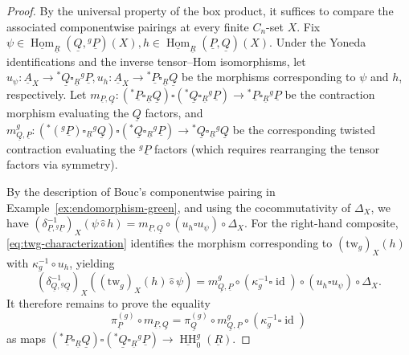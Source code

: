 \documentclass[11pt,oneside]{amsart}
\DeclareMathOperator{\Hom}{Hom}
\DeclareMathOperator{\HH}{HH}
\DeclareMathOperator{\id}{id}
\numberwithin{equation}{section}
\numberwithin{figure}{section}
\theoremstyle{plain}
\theoremstyle{definition}
\theoremstyle{remark}
\begin{document}
\begin{proof}
By the universal property of the box product, it suffices to compare
the associated componentwise pairings at every finite \(C_n\)-set
\(X\). Fix
\(
\psi\in
\underline{\Hom}_{\underline R}
(\underline Q,{}^g\underline P)(X),
h\in
\underline{\Hom}_{\underline R}
(\underline P,\underline Q)(X).
\)
Under the Yoneda identifications and the inverse tensor--Hom
isomorphisms, let
\(
u_\psi\colon
\underline A_X
\to
{}^*\underline Q\square_{\underline R}{}^g\underline P,
u_h\colon
\underline A_X
\to
{}^*\underline P\square_{\underline R}\underline Q
\)
be the morphisms corresponding to \(\psi\) and \(h\), respectively. Let \(m_{\underline P,\underline Q}\colon ({}^*\underline P\square_{\underline R}\underline Q) \square \allowbreak ({}^*\underline Q\square_{\underline R}{}^g\underline P) \to {}^*\underline P\square_{\underline R}{}^g\underline P\) be the contraction morphism evaluating the  \(\underline Q\) factors, and  \(m^g_{\underline Q,\underline P}\colon ({}^*({}^g\underline P)\square_{\underline R}{}^g\underline Q) \square \allowbreak ({}^*\underline Q\square_{\underline R}{}^g\underline P) \allowbreak \to {}^*\underline Q\square_{\underline R}{}^g\underline Q\) be the corresponding twisted contraction evaluating the \({}^g\underline P\) factors (which requires rearranging the tensor factors via symmetry).


By the description of Bouc's componentwise pairing in Example~\ref{ex:endomorphism-green}, and using the cocommutativity of $\Delta_X$, we have
\(
(\delta^{-1}_{\underline P,{}^g\underline P})_X (\psi\mathbin{\hat\circ}h) = m_{\underline P,\underline Q} \circ (u_h\square u_\psi) \circ \Delta_X.
\)
For the right-hand composite, \eqref{eq:twg-characterization} identifies the morphism
corresponding to $(\mathrm{tw}_g)_X(h)$ with $\kappa_g^{-1}\circ u_h$, yielding \[(\delta^{-1}_{\underline Q,{}^g\underline Q})_X ((\mathrm{tw}_g)_X(h)\mathbin{\hat\circ}\psi) = m^g_{\underline Q,\underline P} \circ (\kappa_g^{-1}\square\id) \circ (u_h\square u_\psi) \circ \Delta_X.\] It therefore remains to prove the equality
\begin{equation}\label{eq:pi_contraction}
\pi_{\underline P}^{(g)} \circ m_{\underline P,\underline Q} = \pi_{\underline Q}^{(g)} \circ m^g_{\underline Q,\underline P} \circ (\kappa_g^{-1}\square\id) 
\end{equation}
as maps $({}^*\underline P\square_{\underline R}\underline Q) \square ({}^*\underline Q\square_{\underline R}{}^g\underline P) \to \underline{\HH}_0^g(\underline R)$.


\end{proof}
\end{document}
